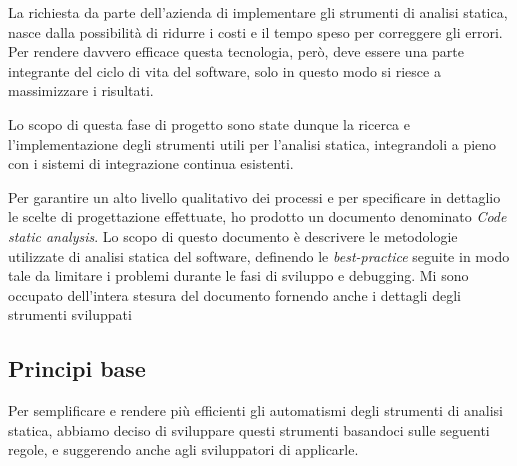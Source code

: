 La richiesta da parte dell'azienda di implementare gli strumenti di analisi statica, nasce dalla possibilità di ridurre i costi e il tempo speso per correggere gli errori. Per rendere davvero efficace questa tecnologia, però, deve essere una parte integrante del ciclo di vita del software, solo in questo modo si riesce a massimizzare i risultati.

Lo scopo di questa fase di progetto sono state dunque la ricerca e l'implementazione degli strumenti utili per l'analisi statica, integrandoli a pieno con i sistemi di integrazione continua esistenti.

Per garantire un alto livello qualitativo dei processi e per specificare in dettaglio le scelte di progettazione effettuate, ho prodotto un documento denominato \textit{Code static analysis}.
Lo scopo di questo documento è descrivere le metodologie utilizzate di analisi statica del software, definendo le \textit{best-practice} seguite in modo tale da limitare i problemi durante le fasi di sviluppo e debugging. Mi sono occupato dell'intera stesura del documento fornendo anche i dettagli degli strumenti sviluppati

\subsection{Principi base}
Per semplificare e rendere più efficienti gli automatismi degli strumenti di analisi statica, abbiamo deciso di sviluppare questi strumenti basandoci sulle seguenti regole, e suggerendo anche agli sviluppatori di applicarle. 

